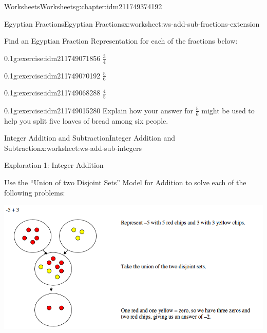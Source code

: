 \documentclass[twoside,11pt,]{book}
\begin{document}
\begin{chapterptx}{Worksheets}{}{Worksheets}{}{}{g:chapter:idm211749374192}
\begin{worksheet-section-numberless}{Egyptian Fractions}{}{Egyptian Fractions}{}{}{x:worksheet:ws-add-sub-fractions-extension}
\begin{introduction}{}
\par
Find an Egyptian Fraction Representation for each of the fractions below:%
\end{introduction}%
\begin{divisionexercise}{1}{}{0.1}{g:exercise:idm211749071856}%
\(\frac{3}{4} \)%
\end{divisionexercise}%
\begin{divisionexercise}{2}{}{0.1}{g:exercise:idm211749070192}%
\(\frac{5}{6} \)%
\end{divisionexercise}%
\begin{divisionexercise}{3}{}{0.1}{g:exercise:idm211749068288}%
\(\frac{4}{5} \)%
\end{divisionexercise}%
\begin{divisionexercise}{4}{}{0.1}{g:exercise:idm211749015280}%
Explain how your answer for \(\frac{5}{6} \) might be used to help you split five loaves of bread among six people.%
\end{divisionexercise}%
\end{worksheet-section-numberless}
\restoregeometry
%
%
\typeout{************************************************}
\typeout{************************************************}
%
\begin{worksheet-section-numberless}{Integer Addition and Subtraction}{}{Integer Addition and Subtraction}{}{}{x:worksheet:ws-add-sub-integers}
\begin{introduction}{}%
Exploration 1: Integer Addition%
\par
Use the ``Union of two Disjoint Sets'' Model for Addition to solve each of the following problems: \begin{sidebyside}{1}{0}{0}{0}%
\begin{sbspanel}{1}%
\includegraphics[width=1\linewidth]{images/integer-add-model.png}

\end{sbspanel}
\end{sidebyside}
\end{introduction}
\end{worksheet-section-numberless}
\end{chapterptx}
\end{document}
